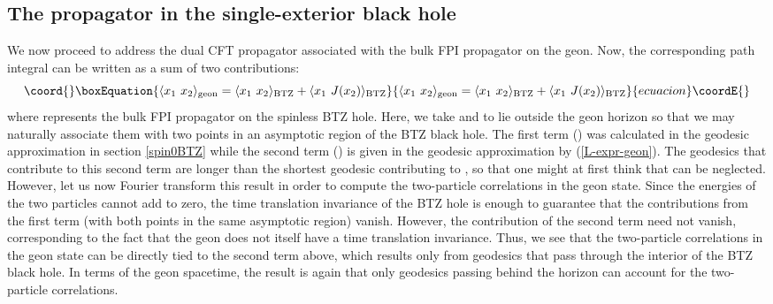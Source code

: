 \documentclass[a4paper,12pt]{article}
\begin{document}
\subsection{The propagator in the single-exterior black hole}
\label{subsec:propag-in-geon}

We now proceed to address the dual CFT propagator associated with the
bulk FPI propagator \coordHE{} on the
\coordHE{} geon.  Now, the corresponding path
integral can be written as a sum of two contributions:
\begin{equation}\coord{}\boxEquation{
\langle x_1 \ x_2 \rangle_{\rm geon} = \langle x_1 \ x_2 \rangle_{\rm
BTZ}
+ \langle x_1 \ J(x_2) \rangle_{\rm BTZ}
}{
\langle x_1 \ x_2 \rangle_{\rm geon} = \langle x_1 \ x_2 \rangle_{\rm
BTZ}
+ \langle x_1 \ J(x_2) \rangle_{\rm BTZ}
}{ecuacion}\coordE{}\end{equation}
where \coordHE{} represents the bulk FPI
propagator on the spinless BTZ hole.  Here, we take \coordHE{} and \coordHE{} to
lie outside the geon horizon so that we may naturally associate them
with two points in an asymptotic region of the BTZ black hole.  The
first term (\coordHE{}) was calculated in
the geodesic approximation in section \ref{spin0BTZ} while the second
term (\coordHE{}) is given in the
geodesic approximation by (\ref{L-expr-geon}).  The geodesics that
contribute to this second term are longer than the shortest geodesic
contributing to \coordHE{}, so that one
might at first think that \coordHE{} can
be neglected.  However, let us now Fourier transform this result in
order to compute the two-particle correlations in the geon state.
Since the energies of the two particles cannot add to zero, the time
translation invariance of the BTZ hole is enough to guarantee that the
contributions from the first term (with both points in the same
asymptotic region) vanish.  However, the contribution of the second
term need not vanish, corresponding to the fact that the geon does not
itself have a time translation invariance.  Thus, we see that the
two-particle correlations in the geon state can be directly tied to
the second term above, which results only from geodesics that pass through
the interior of the BTZ black hole.  In terms of the geon spacetime, 
the result is again that only geodesics passing behind the horizon
can account for the two-particle correlations.
\end{document}
